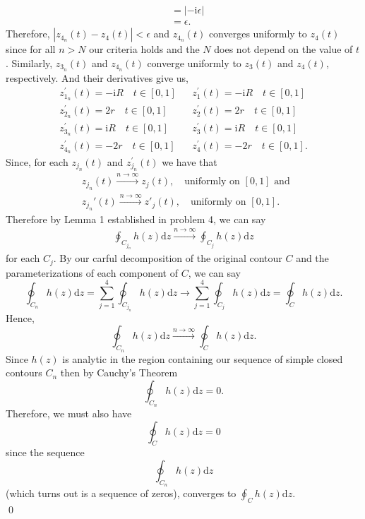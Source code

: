 \documentclass[10pt]{amsart}
\newcommand{\D}{\mathrm{d}}
\newcommand{\I}{\mathrm{i}}
\theoremstyle{nonumberplain}
\begin{document}
\begin{enumerate}[label={\bf {\arabic*}:}]
\begin{itemize}
\begin{align*}
	&= \left| - \I \epsilon \right| \\
	&= \epsilon.
\end{align*}
Therefore, $\left| z_{4_n}(t) - z_4(t) \right| < \epsilon$ and $z_{4_n}(t)$ converges uniformly to $z_4(t)$ since for all $n > N$ our criteria holds and the $N$ does not depend on the value of $t$.
Similarly, $z_{3_n}(t)$ and $z_{4_n}(t)$ converge uniformly to $z_3(t)$ and $z_4(t)$, respectively.
And their derivatives give us,
\begin{align*}
&z_{1_n}^\prime(t) = -\I R \quad t \in [0, 1]& &z_1^\prime(t) = -\I R \quad t \in [0, 1]& \\
&z_{2_n}^\prime(t) = 2r \quad t \in [0, 1]& &z_2^\prime(t) = 2r \quad t \in [0, 1]& \\
&z_{3_n}^\prime(t) = \I R \quad t \in [0, 1]& &z_3^\prime(t) = \I R \quad t \in [0, 1]& \\
&z_{4_n}^\prime(t) = - 2r \quad t \in [0, 1]& &z_4^\prime(t) = - 2r \quad t \in [0, 1].&
\end{align*}
Since, for each $z_{j_n}(t)$ and $z_{j_n}^\prime(t)$ we have that
\begin{align*}
	&z_{j_n}(t) \overset{n \to \infty}{\longrightarrow} z_j(t),  \quad \text{uniformly on } [0,1] \text{ and }\\
        &z_{j_n}'(t) \overset{n \to \infty}{\longrightarrow} z'_j(t), \quad \text{uniformly on } [0,1].
\end{align*}
Therefore by Lemma 1 established in problem 4, we can say
\begin{align*}
\oint_{C_{j_n}}h(z)\D z \overset{n \to \infty}{\longrightarrow} \oint_{C_j}h(z)\D z
\end{align*}
for each $C_j$.
By our carful decomposition of the original contour $C$ and the parameterizations of each component of $C$, we can say 
$$\oint_{C_n} h(z) \D z = \sum_{j = 1}^{4} \oint_{C_{j_n}}h(z) \D z \rightarrow \sum_{j = 1}^{4} \oint_{C_j}h(z) \D z = \oint_{C}h(z)\D z.$$
Hence,
$$\oint_{C_n}h(z)\D z \overset{n \to \infty}{\longrightarrow} \oint_{C}h(z)\D z.$$
Since $h(z)$ is analytic in the region containing our sequence of simple closed contours $C_n$ then by Cauchy's Theorem
$$
\oint_{C_n}h(z)\D z = 0.
$$
Therefore, we must also have
$$\oint_{C}h(z)\D z = 0$$
since the sequence $$\oint_{C_n}h(z)\D z$$ (which turns out is a sequence of zeros), converges to $\oint_{C}h(z)\D z$. \\
\qed \\


\end{itemize}
\end{enumerate}
\end{document}
